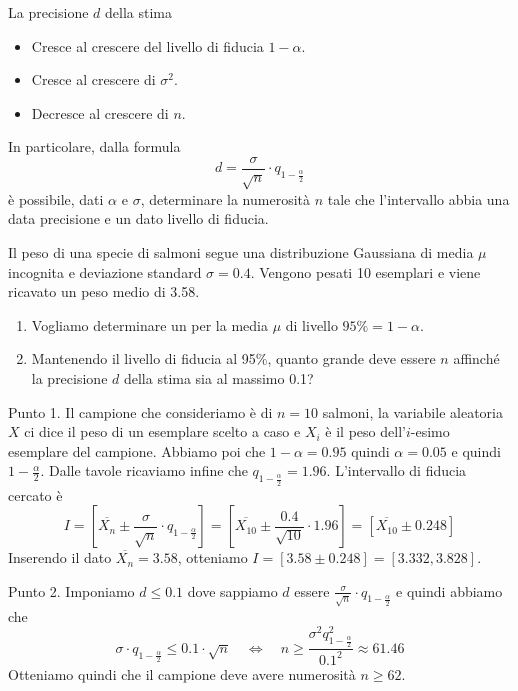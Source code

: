 \begin{observation}
	La precisione $d$ della stima
	\begin{itemize}
		\item Cresce al crescere del livello di fiducia $1-\alpha$.
		\item Cresce al crescere di $\sigma^2$.
		\item Decresce al crescere di $n$.
	\end{itemize}
	In particolare, dalla formula
	\[ d = \frac{\sigma}{\sqrt{n}} \cdot q_{1 - \frac{\alpha}{2}} \]
	è possibile, dati $\alpha$ e $\sigma$, determinare la numerosità $n$ tale che l'intervallo
	abbia una data precisione e un dato livello di fiducia.
\end{observation}

\begin{example}
	Il peso di una specie di salmoni segue una distribuzione Gaussiana di media $\mu$ incognita e
	deviazione standard $\sigma = 0.4$. Vengono pesati 10 esemplari e viene ricavato un peso medio
	di 3.58.
	\begin{enumerate}
		\item Vogliamo determinare un \IF per la media $\mu$ di livello $95\% = 1 - \alpha$.
		\item Mantenendo il livello di fiducia al 95\%, quanto grande deve essere $n$ affinché la
		      precisione $d$ della stima sia al massimo 0.1?
	\end{enumerate}

	Punto 1. Il campione che consideriamo è di $n=10$ salmoni, la variabile aleatoria $X$ ci dice
	il peso di un esemplare scelto a caso e $X_i$ è il peso dell'$i$-esimo esemplare del campione.
	Abbiamo poi che $1-\alpha = 0.95$ quindi $\alpha=0.05$ e quindi $1 - \frac{\alpha}{2}$. Dalle
	tavole ricaviamo infine che $q_{1-\frac{\alpha}{2}} = 1.96$. L'intervallo di fiducia cercato è
	\[
		I = \left[ \overline{X_n} \pm \frac{\sigma}{\sqrt{n}} \cdot q_{1-\frac{\alpha}{2}} \right]
		= \left[ \overline{X_{10}} \pm \frac{0.4}{\sqrt{10}} \cdot 1.96 \right]
		= \left[ \overline{X_{10}} \pm 0.248 \right]
	\]
	Inserendo il dato $\overline{X_n} = 3.58$, otteniamo $I = [3.58 \pm 0.248] = [3.332, 3.828]$.

	Punto 2. Imponiamo $d \leq 0.1$ dove sappiamo $d$ essere
	$\frac{\sigma}{\sqrt{n}} \cdot q_{1-\frac{\alpha}{2}}$ e quindi abbiamo che
	\[
		\sigma \cdot q_{1-\frac{\alpha}{2}} \leq 0.1 \cdot \sqrt{n}
		\quad \Leftrightarrow \quad
		n \geq \frac{\sigma^2 q_{1-\frac{\alpha}{2}}^2}{0.1^2} \approx 61.46
	\]
	Otteniamo quindi che il campione deve avere numerosità $n \geq 62$.
\end{example}

\begin{proposition}

\end{proposition}